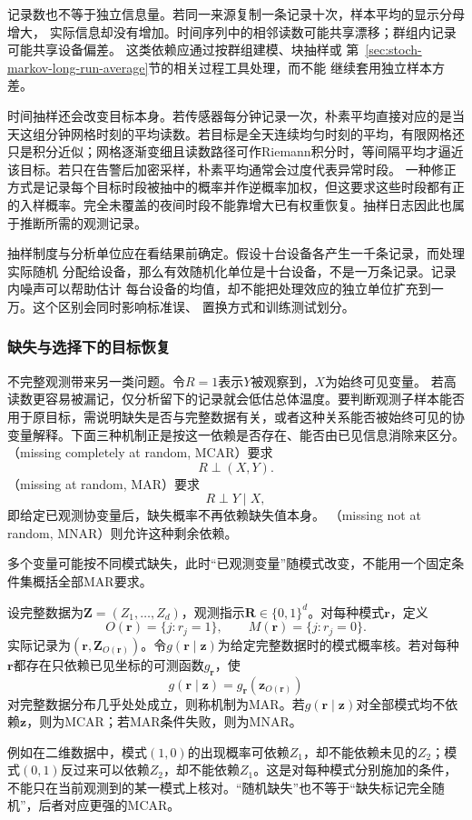 记录数也不等于独立信息量。若同一来源复制一条记录十次，样本平均的显示分母增大，
实际信息却没有增加。时间序列中的相邻读数可能共享漂移；群组内记录可能共享设备偏差。
这类依赖应通过按群组建模、块抽样或
第~\ref{sec:stoch-markov-long-run-average}节的相关过程工具处理，而不能
继续套用独立样本方差。

时间抽样还会改变目标本身。若传感器每分钟记录一次，朴素平均直接对应的是当天这组分钟网格时刻的平均读数。若目标是全天连续均匀时刻的平均，有限网格还只是积分近似；网格逐渐变细且读数路径可作Riemann积分时，等间隔平均才逼近该目标。若只在告警后加密采样，朴素平均通常会过度代表异常时段。
一种修正方式是记录每个目标时段被抽中的概率并作逆概率加权，但这要求这些时段都有正的入样概率。完全未覆盖的夜间时段不能靠增大已有权重恢复。抽样日志因此也属于推断所需的观测记录。

抽样制度与分析单位应在看结果前确定。假设十台设备各产生一千条记录，而处理实际随机
分配给设备，那么有效随机化单位是十台设备，不是一万条记录。记录内噪声可以帮助估计
每台设备的均值，却不能把处理效应的独立单位扩充到一万。这个区别会同时影响标准误、
置换方式和训练测试划分。

\subsubsection{缺失与选择下的目标恢复}

不完整观测带来另一类问题。令\(R=1\)表示\(Y\)被观察到，\(X\)为始终可见变量。
若高读数更容易被漏记，仅分析留下的记录就会低估总体温度。要判断观测子样本能否用于原目标，需说明缺失是否与完整数据有关，或者这种关系能否被始终可见的协变量解释。下面三种机制正是按这一依赖是否存在、能否由已见信息消除来区分。
（missing completely at random, MCAR）要求
\[
  R\mathrel{\perp}(X,Y).
\]
（missing at random, MAR）要求
\[
  R\mathrel{\perp}Y\mid X,
\]
即给定已观测协变量后，缺失概率不再依赖缺失值本身。
（missing not at random, MNAR）则允许这种剩余依赖。

多个变量可能按不同模式缺失，此时“已观测变量”随模式改变，不能用一个固定条件集概括全部MAR要求。
\begin{definition}[观测模式与缺失机制]
  \label{def:statistics-missingness}
  设完整数据为\(\bm Z=(Z_1,\ldots,Z_d)\)，观测指示\(\bm R\in\{0,1\}^d\)。对每种模式\(\bm r\)，定义
  \[
    O(\bm r)=\{j:r_j=1\},\qquad M(\bm r)=\{j:r_j=0\}.
  \]
  实际记录为\((\bm r,\bm Z_{O(\bm r)})\)。令\(g(\bm r\mid\bm z)\)为给定完整数据时的模式概率核。若对每种\(\bm r\)都存在只依赖已见坐标的可测函数\(g_{\bm r}\)，使
  \[
    g(\bm r\mid\bm z)=g_{\bm r}(\bm z_{O(\bm r)})
  \]
  对完整数据分布几乎处处成立，则称机制为MAR。若\(g(\bm r\mid\bm z)\)对全部模式均不依赖\(\bm z\)，则为MCAR；若MAR条件失败，则为MNAR。
\end{definition}
例如在二维数据中，模式\((1,0)\)的出现概率可依赖\(Z_1\)，却不能依赖未见的\(Z_2\)；模式\((0,1)\)反过来可以依赖\(Z_2\)，却不能依赖\(Z_1\)。这是对每种模式分别施加的条件，不能只在当前观测到的某一模式上核对。“随机缺失”也不等于“缺失标记完全随机”，后者对应更强的MCAR。

